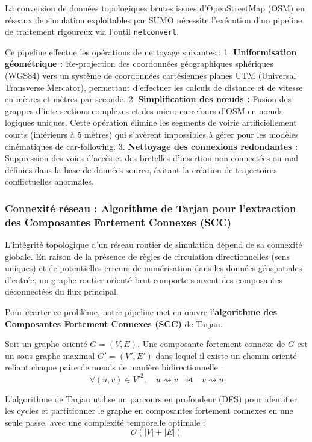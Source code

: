 \documentclass[10pt, a4paper]{article}
\begin{document}
La conversion de données topologiques brutes issues d'OpenStreetMap
(OSM) en réseaux de simulation exploitables par SUMO nécessite
l'exécution d'un pipeline de traitement rigoureux via l'outil
\texttt{netconvert}.

Ce pipeline effectue les opérations de nettoyage suivantes : 1.
\textbf{Uniformisation géométrique :} Re-projection des coordonnées
géographiques sphériques (WGS84) vers un système de coordonnées
cartésiennes planes UTM (Universal Transverse Mercator), permettant
d'effectuer les calculs de distance et de vitesse en mètres et mètres
par seconde. 2. \textbf{Simplification des nœuds :} Fusion des grappes
d'intersections complexes et des micro-carrefours d'OSM en nœuds
logiques uniques. Cette opération élimine les segments de voirie
artificiellement courts (inférieurs à 5 mètres) qui s'avèrent
impossibles à gérer pour les modèles cinématiques de car-following. 3.
\textbf{Nettoyage des connexions redondantes :} Suppression des voies
d'accès et des bretelles d'insertion non connectées ou mal définies dans
la base de données source, évitant la création de trajectoires
conflictuelles anormales.

\subsubsection{Connexité réseau : Algorithme de Tarjan pour l'extraction
des Composantes Fortement Connexes
(SCC)}\label{connexituxe9-ruxe9seau-algorithme-de-tarjan-pour-lextraction-des-composantes-fortement-connexes-scc}

L'intégrité topologique d'un réseau routier de simulation dépend de sa
connexité globale. En raison de la présence de règles de circulation
directionnelles (sens uniques) et de potentielles erreurs de
numérisation dans les données géospatiales d'entrée, un graphe routier
orienté brut comporte souvent des composantes déconnectées du flux
principal.

Pour écarter ce problème, notre pipeline met en œuvre
l'\textbf{algorithme des Composantes Fortement Connexes (SCC)} de
Tarjan.

Soit un graphe orienté \(G = (V, E)\). Une composante fortement connexe
de \(G\) est un sous-graphe maximal \(G' = (V', E')\) dans lequel il
existe un chemin orienté reliant chaque paire de nœuds de manière
bidirectionnelle :
\[\forall (u, v) \in V'^2, \quad u \rightsquigarrow v \quad \text{et} \quad v \rightsquigarrow u\]

L'algorithme de Tarjan utilise un parcours en profondeur (DFS) pour
identifier les cycles et partitionner le graphe en composantes fortement
connexes en une seule passe, avec une complexité temporelle optimale :
\[\mathcal{O}(|V| + |E|)\]
\end{document}
